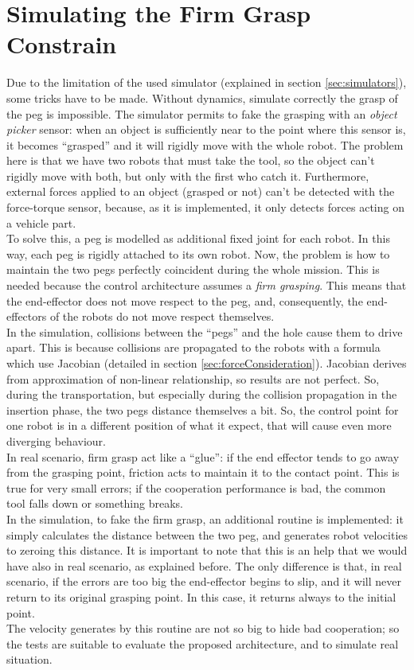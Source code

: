 \section{Simulating the Firm Grasp Constrain}
\label{sec:firmGrasp}
Due to the limitation of the used simulator (explained in section \ref{sec:simulators}), some tricks have to be made. Without dynamics, simulate correctly the grasp of the peg is impossible. The simulator permits to fake the grasping with an \textit{object picker} sensor: when an object is sufficiently near to the point where this sensor is, it becomes \enquote{grasped} and it will rigidly move with the whole robot. The problem here is that we have two robots that must take the tool, so the object can't rigidly move with both, but only with the first who catch it. Furthermore, external forces applied to an object (grasped or not) can't be detected with the force-torque sensor, because, as it is implemented, it only detects forces acting on a vehicle part.\\
To solve this, a peg is modelled as additional fixed joint for each robot. In this way, each peg is rigidly attached to its own robot. Now, the problem is how to maintain the two pegs perfectly coincident during the whole mission. This is needed because the control architecture assumes a \textit{firm grasping}. This means that the end-effector does not move respect to the peg, and, consequently, the end-effectors of the robots do not move respect themselves.\\
In the simulation, collisions between the \enquote{pegs} and the hole cause them to drive apart. This is because collisions are propagated to the robots with a formula which use Jacobian (detailed in section \ref{sec:forceConsideration}). Jacobian derives from approximation of non-linear relationship, so results are not perfect. So, during the transportation, but especially during the collision propagation in the insertion phase, the two pegs distance themselves a bit. So, the control point for one robot is in a different position of what it expect, that will cause even more diverging behaviour.\\
In real scenario, firm grasp act like a \enquote{glue}: if the end effector tends to go away from the grasping point, friction acts to maintain it to the contact point. This is true for very small errors; if the cooperation performance is bad, the common tool falls down or something breaks.\\
In the simulation, to fake the firm grasp, an additional routine is implemented: it simply calculates the distance between the two peg, and generates robot velocities to zeroing this distance. It is important to note that this is an help that we would have also in real scenario, as explained before. The only difference is that, in real scenario, if the errors are too big the end-effector begins to slip, and it will never return to its original grasping point. In this case, it returns always to the initial point. \\
The velocity generates by this routine are not so big to hide bad cooperation; so the tests are suitable to evaluate the proposed architecture, and to simulate real situation.

